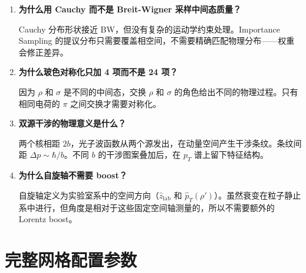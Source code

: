 \documentclass[11pt,a4paper,UTF8]{ctexart}
\begin{document}
\begin{enumerate}[leftmargin=2em]
    \item \textbf{为什么用 Cauchy 而不是 Breit-Wigner 采样中间态质量？}
    
    Cauchy 分布形状接近 BW，但没有复杂的运动学约束处理。Importance Sampling 的提议分布只需要覆盖相空间，不需要精确匹配物理分布——权重会修正差异。
    
    \item \textbf{为什么玻色对称化只加 4 项而不是 24 项？}
    
    因为 $\rho$ 和 $\sigma$ 是不同的中间态，交换 $\rho$ 和 $\sigma$ 的角色给出不同的物理过程。只有相同电荷的 $\pi$ 之间交换才需要对称化。
    
    \item \textbf{双源干涉的物理意义是什么？}
    
    两个核相距 $2b$，光子波函数从两个源发出，在动量空间产生干涉条纹。条纹间距 $\Delta p \sim \hbar/b$。不同 $b$ 的干涉图案叠加后，在 $p_T$ 谱上留下特征结构。
    
    \item \textbf{为什么自旋轴不需要 boost？}
    
    自旋轴定义为实验室系中的空间方向（$\hat{z}_{\text{lab}}$ 和 $\hat{p}_T(\rho')$）。虽然衰变在粒子静止系中进行，但角度是相对于这些固定空间轴测量的，所以不需要额外的 Lorentz boost。
\end{enumerate}


\section{完整网格配置参数}
\end{document}
